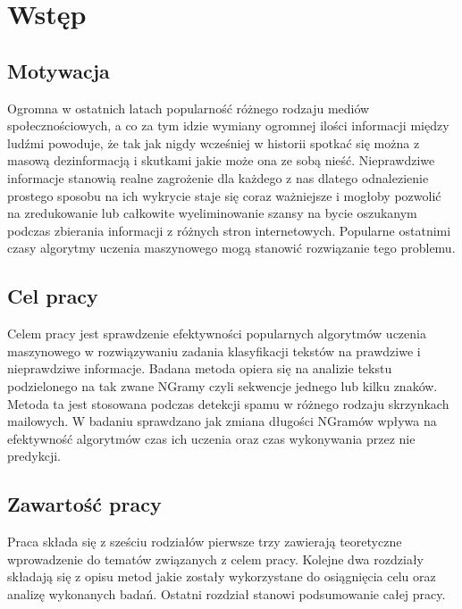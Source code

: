 \chapter*{Wstęp}
\section*{Motywacja}
Ogromna w ostatnich latach popularność różnego rodzaju mediów społecznościowych, a co za tym 
idzie wymiany ogromnej ilości informacji między ludźmi powoduje, że tak jak nigdy wcześniej 
w historii spotkać się można z masową dezinformacją i skutkami jakie może ona ze sobą nieść.
Nieprawdziwe informacje stanowią realne zagrożenie dla każdego z nas dlatego odnalezienie 
prostego sposobu na ich wykrycie staje się coraz ważniejsze i mogłoby pozwolić na 
zredukowanie lub całkowite wyeliminowanie szansy na bycie oszukanym podczas zbierania
informacji z różnych stron internetowych. Popularne ostatnimi czasy algorytmy uczenia 
maszynowego mogą stanowić rozwiązanie tego problemu.
\section*{Cel pracy}
Celem pracy jest sprawdzenie efektywności popularnych algorytmów uczenia maszynowego w rozwiązywaniu 
zadania klasyfikacji tekstów na prawdziwe i nieprawdziwe informacje. Badana metoda opiera 
się na analizie tekstu podzielonego na tak zwane NGramy czyli sekwencje jednego lub kilku znaków.
Metoda ta jest stosowana podczas detekcji spamu w różnego rodzaju skrzynkach mailowych.
W badaniu sprawdzano jak zmiana długości NGramów wpływa na efektywność algorytmów czas ich 
uczenia oraz czas wykonywania przez nie predykcji. 
\section*{Zawartość pracy}
Praca składa się z sześciu rodziałów pierwsze trzy zawierają teoretyczne wprowadzenie 
do tematów związanych z celem pracy. Kolejne dwa rozdziały składają się z opisu metod jakie 
zostały wykorzystane do osiągnięcia celu oraz analizę wykonanych badań. Ostatni rozdział 
stanowi podsumowanie całej pracy.

